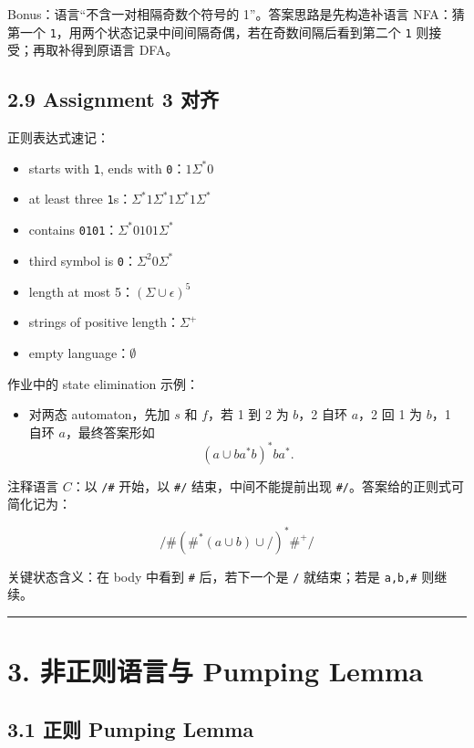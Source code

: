 ﻿\documentclass[UTF8,11pt]{ctexart}
\begin{document}
Bonus：语言“不含一对相隔奇数个符号的 1”。答案思路是先构造补语言 NFA：猜第一个 \texttt{1}，用两个状态记录中间间隔奇偶，若在奇数间隔后看到第二个 \texttt{1} 则接受；再取补得到原语言 DFA。


\subsection{2.9 Assignment 3 对齐}


正则表达式速记：


\begin{itemize}
\item starts with \texttt{1}, ends with \texttt{0}：\(1\Sigma^*0\)
\item at least three \texttt{1}s：\(\Sigma^*1\Sigma^*1\Sigma^*1\Sigma^*\)
\item contains \texttt{0101}：\(\Sigma^*0101\Sigma^*\)
\item third symbol is \texttt{0}：\(\Sigma^2 0\Sigma^*\)
\item length at most 5：\((\Sigma\cup\epsilon)^5\)
\item strings of positive length：\(\Sigma^+\)
\item empty language：\(\emptyset\)
\end{itemize}


作业中的 state elimination 示例：


\begin{itemize}
\item 对两态 automaton，先加 \(s\) 和 \(f\)，若 1 到 2 为 \(b\)，2 自环 \(a\)，2 回 1 为 \(b\)，1 自环 \(a\)，最终答案形如
\[
  (a\cup ba^*b)^*ba^*.
  \]

\end{itemize}


注释语言 \(C\)：以 \texttt{/\#} 开始，以 \texttt{\#/} 结束，中间不能提前出现 \texttt{\#/}。答案给的正则式可简化记为：

\[
/\#(\#^*(a\cup b)\cup /)^*\#^+/
\]

关键状态含义：在 body 中看到 \texttt{\#} 后，若下一个是 \texttt{/} 就结束；若是 \texttt{a,b,\#} 则继续。


\bigskip\hrule\bigskip


\section{3. 非正则语言与 Pumping Lemma}


\subsection{3.1 正则 Pumping Lemma}
\end{document}
